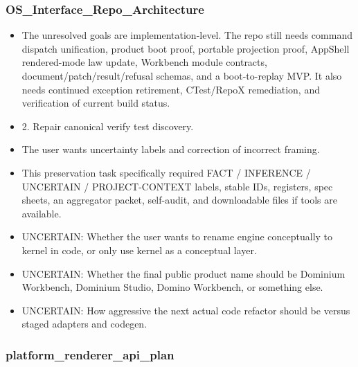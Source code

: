 \documentclass[11pt,a4paper]{report}
\begin{document}
\subsubsection{OS\_Interface\_Repo\_Architecture}

\begin{itemize}
\item The unresolved goals are implementation-level. The repo still needs command dispatch unification, product boot proof, portable projection proof, AppShell rendered-mode law update, Workbench module contracts, document/patch/result/refusal schemas, and a boot-to-replay MVP. It also needs continued exception retirement, CTest/RepoX remediation, and verification of current build status.
\item 2. Repair canonical verify test discovery.
\item The user wants uncertainty labels and correction of incorrect framing.
\item This preservation task specifically required FACT / INFERENCE / UNCERTAIN / PROJECT-CONTEXT labels, stable IDs, registers, spec sheets, an aggregator packet, self-audit, and downloadable files if tools are available.
\item UNCERTAIN: Whether the user wants to rename engine conceptually to kernel in code, or only use kernel as a conceptual layer.
\item UNCERTAIN: Whether the final public product name should be Dominium Workbench, Dominium Studio, Domino Workbench, or something else.
\item UNCERTAIN: How aggressive the next actual code refactor should be versus staged adapters and codegen.
\end{itemize}

\subsubsection{platform\_renderer\_api\_plan}
\end{document}
